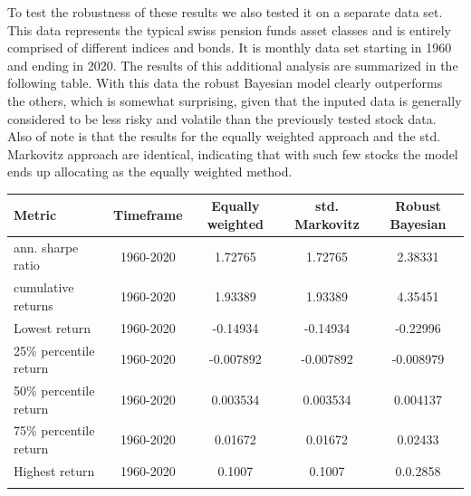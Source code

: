 To test the robustness of these results we also tested it on a separate data set. This data represents the typical swiss pension funds asset classes and is entirely comprised of different indices and bonds. It is monthly data set starting in 1960 and ending in 2020. The results of this additional analysis are summarized in the following table. With this data the robust Bayesian model clearly outperforms the others, which is somewhat surprising, given that the inputed data is generally considered to be less risky and volatile than the previously tested stock data. Also of note is that the results for the equally weighted approach and the std. Markovitz approach are identical, indicating that with such few stocks the model ends up allocating as the equally weighted method. 
\begin{center}
\begin{tabular}{l c c c c}
\textbf{Metric} & \textbf{Timeframe} & \textbf{Equally weighted} & \textbf{std. Markovitz} & \textbf{Robust Bayesian}\\ 
\hline
ann. sharpe ratio & 1960-2020 & 1.72765 & 1.72765 & 2.38331 \\
cumulative returns & 1960-2020 & 1.93389 & 1.93389 & 4.35451 \\
Lowest return & 1960-2020 & -0.14934 & -0.14934 & -0.22996 \\
25\% percentile return & 1960-2020 & -0.007892 & -0.007892 & -0.008979 \\
50\% percentile return & 1960-2020 & 0.003534 & 0.003534 & 0.004137 \\
75\% percentile return & 1960-2020 & 0.01672 & 0.01672 & 0.02433 \\
Highest return & 1960-2020 & 0.1007 & 0.1007 & 0.0.2858  \\
\hline
\caption{Indices data}
\end{tabular}
\end{center}

